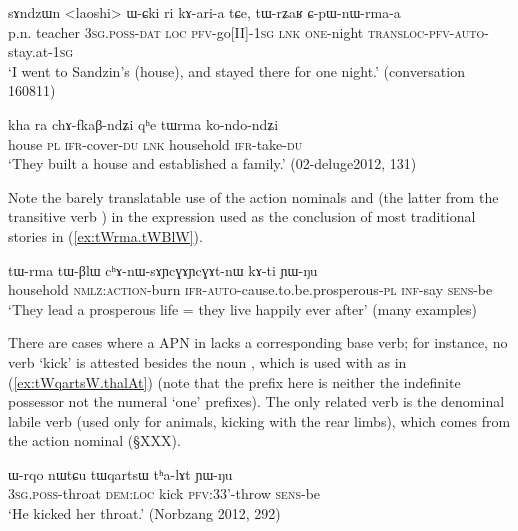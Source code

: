 \begin{exe}
\ex \label{ex:CpWnWrmaa}
\gll sɤndzɯn <laoshi> ɯ-ɕki ri kɤ-ari-a tɕe, tɯ-rʑaʁ ɕ-pɯ-nɯ-rma-a \\
p.n. teacher \textsc{3sg}.\textsc{poss}-\textsc{dat} \textsc{loc} \textsc{pfv}-go[II]-\textsc{1sg} \textsc{lnk} \textsc{one}-night \textsc{transloc}-\textsc{pfv}-\textsc{auto}-stay.at-\textsc{1sg} \\
\glt `I went to Sandzin's (house), and stayed there for one night.' (conversation 160811)
\end{exe}

\begin{exe}
\ex \label{ex:tWrma.kondondZi}
\gll kha ra chɤ-fkaβ-ndʑi qʰe tɯrma ko-ndo-ndʑi \\
house \textsc{pl} \textsc{ifr}-cover-\textsc{du} \textsc{lnk} household \textsc{ifr}-take-\textsc{du} \\
\glt `They built a house and established a family.' (02-deluge2012, 131)
\end{exe}

Note the barely translatable use of the action nominals  and  (the latter from the transitive verb ) in the expression used as the conclusion of most traditional stories in (\ref{ex:tWrma.tWBlW}).

\begin{exe}
\ex \label{ex:tWrma.tWBlW}
\gll  tɯ-rma tɯ-βlɯ cʰɤ-nɯ-sɤɲcɣɤɲcɣɤt-nɯ kɤ-ti ɲɯ-ŋu \\
household \textsc{nmlz}:\textsc{action}-burn \textsc{ifr}-\textsc{auto}-cause.to.be.prosperous-\textsc{pl} \textsc{inf}-say \textsc{sens}-be \\
\glt `They lead a prosperous life = they live happily ever after' (many examples)
\end{exe}


There are cases where a APN in  lacks a corresponding base verb; for instance, no verb  `kick' is attested besides the noun , which is used with  as in (\ref{ex:tWqartsW.thalAt}) (note that the  prefix here is neither the indefinite possessor not the numeral `one' prefixes). The only related verb is the denominal labile verb  (used only for animals, kicking with the rear limbs), which comes from the action nominal  (§XXX).

\begin{exe}
\ex \label{ex:tWqartsW.thalAt}
\gll  ɯ-rqo nɯtɕu tɯqartsɯ tʰa-lɤt ɲɯ-ŋu \\
\textsc{3sg}.\textsc{poss}-throat \textsc{dem}:\textsc{loc} kick \textsc{pfv}:3\fl{}3'-throw \textsc{sens}-be \\
\glt `He kicked her throat.' (Norbzang 2012, 292)
\end{exe}

